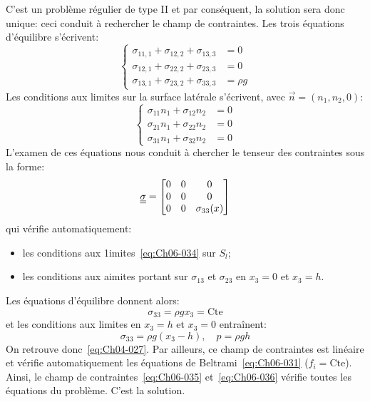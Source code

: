 C'est un problème régulier de type II et par conséquent, la solution sera donc unique: ceci conduit à rechercher le champ de contraintes.
Les trois équations d'équilibre s'écrivent:
\begin{equation}
    \left\{
    \begin{aligned}
        \sigma_{11,1} + \sigma_{12,2} + \sigma_{13,3} &= 0 \\
        \sigma_{12,1} + \sigma_{22,2} + \sigma_{23,3} &= 0 \\
        \sigma_{13,1} + \sigma_{23,2} + \sigma_{33,3} &= \rho g
    \end{aligned}
    \right.
    \label{eq:Ch06-033}
\end{equation}
Les conditions aux limites sur la surface latérale s'écrivent, avec $\vec{n} = \left( n_1, n_2, 0 \right)$:
\begin{equation}
    \left\{
    \begin{aligned}
        \sigma_{11}n_1 + \sigma_{12}n_2 &= 0 \\
        \sigma_{21}n_1 + \sigma_{22}n_2 &= 0 \\
        \sigma_{31}n_1 + \sigma_{32}n_2 &= 0
    \end{aligned}
    \right.
    \label{eq:Ch06-034}
\end{equation}
L'examen de ces équations nous conduit à chercher le tenseur des contraintes sous la forme:
\begin{equation}
    \underline{\underline{\sigma}} = 
    \begin{bmatrix}
        0 & 0 & 0 \\
        0 & 0 & 0 \\
        0 & 0 & \sigma_{33}(x)
    \end{bmatrix}
    \label{eq:Ch06-035}
\end{equation}
qui vérifie automatiquement:
\begin{itemize}
    \item les conditions aux 1imites~\eqref{eq:Ch06-034} sur $S_l$;
    \item les conditions aux aimites portant sur $\sigma_{13}$ et $\sigma_{23}$ en $x_3 = 0$ et $x_3 =h$.
\end{itemize}
Les équations d'équilibre donnent alors:
\begin{equation*}
    \sigma_{33} = \rho g x_3 = \text{Cte}
\end{equation*}
et les conditions aux limites en $x_3=h$ et $x_3=0$ entraînent:
\begin{equation}
    \sigma_{33} = \rho g \left( x_3 -h \right), \quad p = \rho g h
    \label{eq:Ch06-036}
\end{equation}
On retrouve donc~\eqref{eq:Ch04-027}.
Par ailleurs, ce champ de contraintes est linéaire et vérifie automatiquement les équations de Beltrami~\eqref{eq:Ch06-031} ($f_i = \text{Cte}$).
Ainsi, le champ de contraintes~\eqref{eq:Ch06-035} et~\eqref{eq:Ch06-036} vérifie toutes les équations du problème.
C'est la solution.

